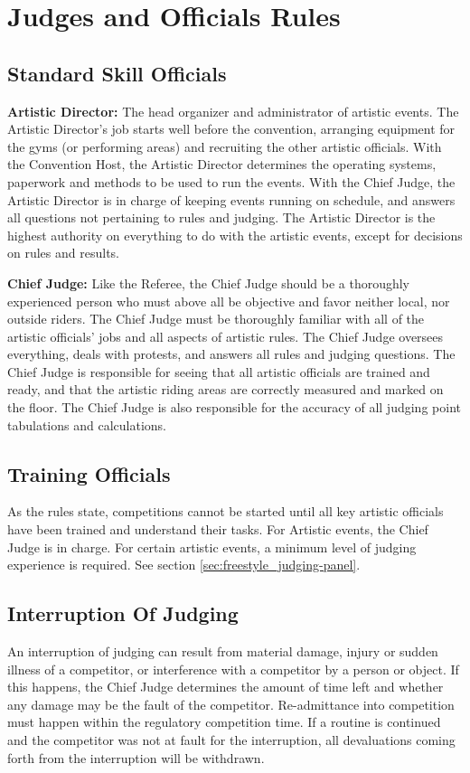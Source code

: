 \chapter{Judges and Officials Rules}

\section{Standard Skill Officials}%
\textbf{Artistic Director:} The head organizer and administrator of artistic events.
The Artistic Director's job starts well before the convention, arranging equipment for the gyms (or performing areas) and recruiting the other artistic officials.
With the Convention Host, the Artistic Director determines the operating systems, paperwork and methods to be used to run the events.
With the Chief Judge, the Artistic Director is in charge of keeping events running on schedule, and answers all questions not pertaining to rules and judging.
The Artistic Director is the highest authority on everything to do with the artistic events, except for decisions on rules and results.

\textbf{Chief Judge:} Like the Referee, the Chief Judge should be a thoroughly experienced person who must above all be objective and favor neither local, nor outside riders.
The Chief Judge must be thoroughly familiar with all of the artistic officials' jobs and all aspects of artistic rules.
The Chief Judge oversees everything, deals with protests, and answers all rules and judging questions.
The Chief Judge is responsible for seeing that all artistic officials are trained and ready, and that the artistic riding areas are correctly measured and marked on the floor.
The Chief Judge is also responsible for the accuracy of all judging point tabulations and calculations.

\section{Training Officials}
As the rules state, competitions cannot be started until all key artistic officials have been trained and understand their tasks.
For Artistic events, the Chief Judge is in charge.
For certain artistic events, a minimum level of judging experience is required.
See section \ref{sec:freestyle_judging-panel}.

\section{Interruption Of Judging}
An interruption of judging can result from material damage, injury or sudden illness of a competitor, or interference with a competitor by a person or object.
If this happens, the Chief Judge determines the amount of time left and whether any damage may be the fault of the competitor.
Re-admittance into competition must happen within the regulatory competition time.
If a routine is continued and the competitor was not at fault for the interruption, all devaluations coming forth from the interruption will be withdrawn.

